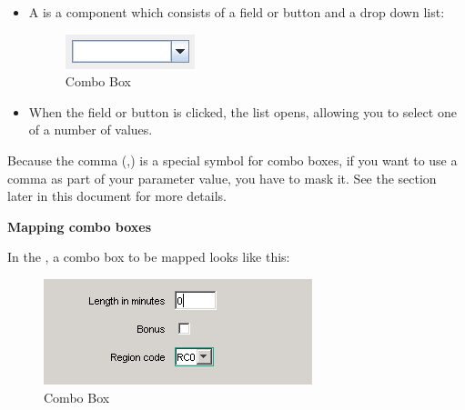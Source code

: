\begin{itemize}
\item A  is a component which consists of a field or button and a drop down list:

\begin{figure}
\begin{center}
\includegraphics{PS/Combobox}
\caption{Combo Box}
\label{Combobox}
\end{center}
\end{figure}


  \item When the field or button is clicked, the list opens, allowing you to select one of a number of values.
\end{itemize}


Because the comma (,) is a special symbol for combo boxes, if you want to use a comma as part of your parameter value, you have to mask it. See the section later in this document  for more details. 

\textbf{Mapping combo boxes}

In the \gdomm{}, a combo box to be mapped looks like this:

\begin{figure}
\begin{center}
\includegraphics{PS/Mapcombobox}
\caption{Combo Box}
\label{mapcombobox}
\end{center}
\end{figure}

